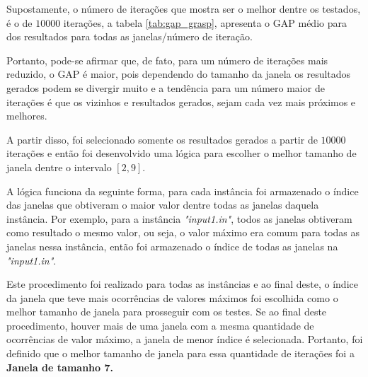 \documentclass[a4paper, 12pt]{article}
\begin{document}
Supostamente, o número de iterações que mostra ser o melhor dentre os testados, é o de $10000$ iterações, a
tabela \ref{tab:gap_grasp}, apresenta o GAP médio para dos resultados para todas as janelas/número de iteração.

\begin{table}[htbp]
    \centering
\end{table}

Portanto, pode-se afirmar que, de fato, para um número de iterações mais reduzido, o GAP é maior, pois
dependendo do tamanho da janela os resultados gerados podem se divergir muito e a tendência para um número
maior de iterações é que os vizinhos e resultados gerados, sejam cada vez mais próximos e melhores.

A partir disso, foi selecionado somente os resultados gerados a partir de $10000$ iterações
e então foi desenvolvido uma lógica para escolher o melhor tamanho de janela dentre o intervalo $[2,9]$.

A lógica funciona da seguinte forma, para cada instância foi armazenado o índice das janelas que obtiveram
o maior valor dentre todas as janelas daquela instância. Por exemplo, para a instância \textit{"input1.in"},
todos as janelas obtiveram como resultado o mesmo valor, ou seja, o valor máximo era comum para todas as janelas
nessa instância, então foi armazenado o índice de todas as janelas na \textit{"input1.in"}.

Este procedimento foi realizado para todas as instâncias e ao final deste, o índice da janela que teve 
mais ocorrências de valores máximos foi escolhida como o melhor tamanho de janela para prosseguir com os testes. Se
ao final deste procedimento, houver mais de uma janela com a mesma quantidade de ocorrências de valor máximo,
a janela de menor índice é selecionada.
Portanto, foi definido que o melhor tamanho de janela para essa quantidade de iterações foi a \textbf{Janela de tamanho 7.}
\end{document}

